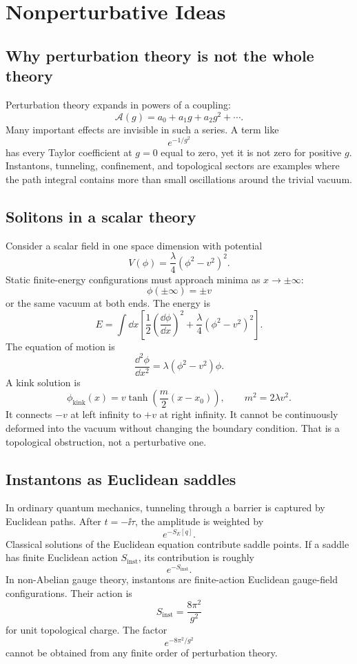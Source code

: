 \chapter{Nonperturbative Ideas}

\section{Why perturbation theory is not the whole theory}

Perturbation theory expands in powers of a coupling:
\[
  \mathcal A(g)=a_0+a_1g+a_2g^2+\cdots.
\]
Many important effects are invisible in such a series.  A term like
\[
  e^{-1/g^2}
\]
has every Taylor coefficient at \(g=0\) equal to zero, yet it is not zero for positive \(g\).  Instantons, tunneling, confinement, and topological sectors are examples where the path integral contains more than small oscillations around the trivial vacuum.

\section{Solitons in a scalar theory}

Consider a scalar field in one space dimension with potential
\[
  V(\phi)=\frac{\lambda}{4}(\phi^2-v^2)^2.
\]
Static finite-energy configurations must approach minima as \(x\to\pm\infty\):
\[
  \phi(\pm\infty)=\pm v
\]
or the same vacuum at both ends.  The energy is
\[
  E=\int\dd x\left[
  \frac12\left(\frac{\dd\phi}{\dd x}\right)^2
  +\frac{\lambda}{4}(\phi^2-v^2)^2
  \right].
\]
The equation of motion is
\[
  \frac{\dd^2\phi}{\dd x^2}
  =
  \lambda(\phi^2-v^2)\phi.
\]
A kink solution is
\[
  \phi_{\text{kink}}(x)=v\tanh\left(\frac{m}{2}(x-x_0)\right),
  \qquad m^2=2\lambda v^2.
\]
It connects \(-v\) at left infinity to \(+v\) at right infinity.  It cannot be continuously deformed into the vacuum without changing the boundary condition.  That is a topological obstruction, not a perturbative one.

\section{Instantons as Euclidean saddles}

In ordinary quantum mechanics, tunneling through a barrier is captured by Euclidean paths.  After \(t=-\ii\tau\), the amplitude is weighted by
\[
  e^{-S_E[q]}.
\]
Classical solutions of the Euclidean equation contribute saddle points.  If a saddle has finite Euclidean action \(S_{\text{inst}}\), its contribution is roughly
\[
  e^{-S_{\text{inst}}}.
\]
In non-Abelian gauge theory, instantons are finite-action Euclidean gauge-field configurations.  Their action is
\[
  S_{\text{inst}}=\frac{8\pi^2}{g^2}
\]
for unit topological charge.  The factor
\[
  e^{-8\pi^2/g^2}
\]
cannot be obtained from any finite order of perturbation theory.

